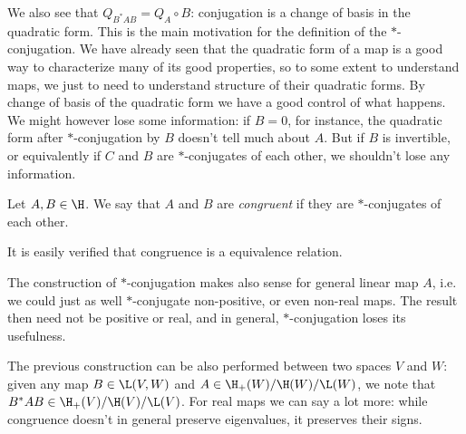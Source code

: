 We also see that $Q_{B^{*}AB} = Q_{A} \circ B$: conjugation is a change of basis in the quadratic form. This is the main motivation for the definition of the $*$-conjugation. We have already seen that the quadratic form of a map is a good way to characterize many of its good properties, so to some extent to understand maps, we just to need to understand structure of their quadratic forms. By change of basis of the quadratic form we have a good control of what happens. We might however lose some information: if $B = 0$, for instance, the quadratic form after $*$-conjugation by $B$ doesn't tell much about $A$. But if $B$ is invertible, or equivalently if $C$ and $B$ are $*$-conjugates of each other, we shouldn't lose any information.

\begin{maar}
	Let $A, B \in \H$. We say that $A$ and $B$ are \textit{congruent} if they are $*$-conjugates of each other.
\end{maar}

It is easily verified that congruence is a equivalence relation.

The construction of $*$-conjugation makes also sense for general linear map $A$, i.e. we could just as well $*$-conjugate non-positive, or even non-real maps. The result then need not be positive or real, and in general, $*$-conjugation loses its usefulness.

The previous construction can be also performed between two spaces $V$ and $W$: given any map $B \in \L(V, W)$ and $A \in \H_{+}(W)/\H(W)/\L(W)$, we note that $B^{*}AB \in \H_{+}(V)/\H(V)/\L(V)$. For real maps we can say a lot more: while congruence doesn't in general preserve eigenvalues, it preserves their signs.

